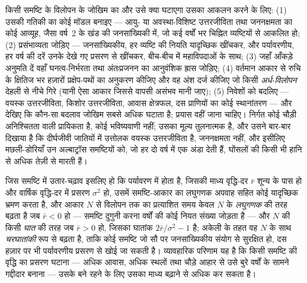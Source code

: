 \begin{method}\label{met:b3:conservation-biology:pva}
किसी समष्टि के विलोपन के जोखिम का और उसे क्या घटाएगा उसका आकलन करने के
लिए: (1) उसकी गतिकी का कोई मॉडल बनाइए --- आयु- या अवस्था-विशिष्ट
उत्तरजीविता तथा जननक्षमता का कोई आव्यूह, जैसा वर्ष~2 के खंड की
जनसांख्यिकी में, जो कई वर्षों भर चिह्नित व्यष्टियों से आकलित हो; (2)
प्रसंभाव्यता जोड़िए --- जनसांख्यिकीय, हर व्यष्टि की नियति यादृच्छिक
खींचकर, और पर्यावरणीय, हर वर्ष की दरें उनके देखे गए प्रसरण से खींचकर,
बीच-बीच में महाविपदाओं के साथ; (3) जहाँ आँकड़े अनुमति दें वहाँ
घनत्व-निर्भरता तथा अंतःप्रजनन का आनुवंशिक ह्रास जोड़िए; (4) वर्तमान आकार
से रुचि के क्षितिज भर हज़ारों प्रक्षेप-पथों का अनुकरण कीजिए और वह अंश
दर्ज कीजिए जो किसी \emph{अर्ध-विलोपन} देहली से नीचे गिरे (यानी ऐसा आकार
जिससे वापसी असंभव मानी जाए); (5) निवेशों को बदलिए --- वयस्क उत्तरजीविता,
किशोर उत्तरजीविता, आवास क्षेत्रफल, दस प्राणियों का कोई स्थानांतरण --- और
देखिए कि कौन-सा बदलाव जोखिम सबसे अधिक घटाता है; प्रयास वहीं जाना चाहिए।
निर्गत कोई चौड़ी अनिश्चितता वाली प्रायिकता है, कोई भविष्यवाणी नहीं; उसका
मूल्य तुलनात्मक है, और उसने बार-बार दिखाया है कि दीर्घजीवी जातियों में
उत्तोलक वयस्क उत्तरजीविता है, जननक्षमता नहीं, और इसीलिए मछली-डोरियाँ उन
अल्बाट्रॉस समष्टियों को, जो हर दो वर्ष में एक अंडा देती हैं, घोंसलों की
किसी भी हानि से अधिक तेज़ी से मारती हैं।
\end{method}

\begin{proposition}[विलोपन तक का समय]\label{prop:b3:conservation-biology:time}
जिस समष्टि में उतार-चढ़ाव इसलिए हो कि पर्यावरण में होता है, जिसकी माध्य
वृद्धि-दर $\bar r$ शून्य के पास हो और वार्षिक वृद्धि-दर में प्रसरण
$\sigma^{2}$ हो, उसमें समष्टि-आकार का लघुगणक अपवाह सहित कोई यादृच्छिक
भ्रमण करता है, और आकार $N$ से विलोपन तक का प्रत्याशित समय केवल $N$ के
\emph{लघुगणक} की तरह बढ़ता है जब $\bar r < 0$ हो --- समष्टि दुगुनी करना
वर्षों की कोई नियत संख्या जोड़ता है --- और $N$ की किसी \emph{घात} की तरह
जब $\bar r > 0$ हो, जिसका घातांक $2\bar r/\sigma^{2} - 1$ है; अकेली
 के तहत वह $N$ के साथ \emph{चरघातांकी} रूप से
बढ़ता है, ताकि कोई समष्टि जो सौ पर जनसांख्यिकीय संयोग से सुरक्षित हो, दस
हज़ार पर भी पर्यावरणीय प्रसरण से खोई जा सकती है। व्यावहारिक परिणाम यह है
कि किसी समष्टि की वृद्धि का प्रसरण घटाना --- अधिक आवास, अधिक स्थलों तथा
चौड़े आहार से उसे बुरे वर्षों के सामने गद्दीदार बनाना --- उसके बने रहने
के लिए उसका माध्य बढ़ाने से अधिक कर सकता है।
\end{proposition}
\admitted

